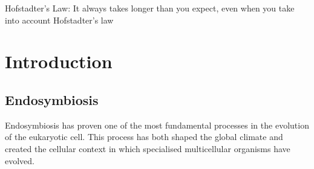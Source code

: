 \graphicspath{{chapters/1.Introduction/figures/}}

\begin{savequote}[75mm]
Hofstadter's Law: It always takes longer than you expect, even when you take into account Hofstadter's law
\end{savequote}

\chapter{Introduction}


\section{Endosymbiosis}

Endosymbiosis has proven one of the most fundamental processes in the evolution of the
eukaryotic cell. This process has both shaped the global climate and
created the cellular context in which specialised multicellular organisms have evolved.


